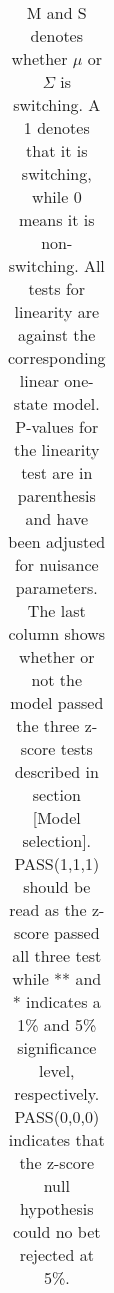 \documentclass[11pt,a4paper,oneside]{article}
\begin{document}
\begin{table}[h!]
\begin{tabular}{lrrrrrrrr}
\bottomrule
\end{tabular}
\caption*{M and S denotes whether $\mu$ or $\Sigma$ is switching. A 1 denotes that it is switching, while 0 means it is non-switching. All tests for linearity are against the corresponding linear one-state model. P-values for the linearity test are in parenthesis and have been adjusted for nuisance parameters. The last column shows whether or not the model passed the three z-score tests described in section [Model selection]. PASS(1,1,1) should be read as the z-score passed all three test while ** and * indicates a 1\% and 5\% significance level, respectively. PASS(0,0,0) indicates that the z-score null hypothesis could no bet rejected at 5\%.}
\vspace{-20mm}
\end{table}


\newpage
{}
\recalctypearea













\printbibliography[heading=none]
\end{document}
